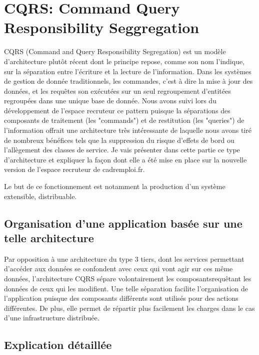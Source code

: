 \section{CQRS: Command Query Responsibility Seggregation}
\label{sec:CQRS: Command Query Responsibility Seggregation}
CQRS (Command and Query Responsibility Segregation) est un modèle d'architecture plutôt récent dont le principe repose, comme son nom l'indique, sur la séparation entre l'écriture et la lecture de l'information.
Dans les systèmes de gestion de donnée traditionnels, les commandes, c'est à dire la mise à jour des données, et les requêtes son exécutées sur un seul regroupement d'entitées regroupées dans une unique base de donnée.
Nous avons suivi lors du développement de l'espace recruteur ce pattern puisque la séparations des composants de traitement (les "commands") et de restitution (les "queries") de l'information offrait une architecture très intéressante de laquelle nous avons tiré de nombreux bénéfices tels que la suppression du risque d'effets de bord ou l'allègement des classes de service.
Je vais présenter dans cette partie ce type d'architecture et expliquer la façon dont elle a été mise en place sur la nouvelle version de l'espace recruteur de cadremploi.fr.


Le but de ce fonctionnement est notamment la production d'un système extensible, distribuable.
\subsection{Organisation d'une application basée sur une telle architecture}
Par opposition à une architecture du type 3 tiers, dont les services permettant d'accéder aux données se confondent avec ceux qui vont agir sur ces même données, l'architecture CQRS sépare volontairement les composantsrequêtant les données de ceux qui les modifient.
Une telle séparation facilite l'organisation de l'application puisque des composants différents sont utilisés pour des actions différentes.
De plus, elle permet de répartir plus facilement les charges dans le cas d'une infrastructure distribuée.

\subsection{Explication détaillée}
\label{sub:explication}
